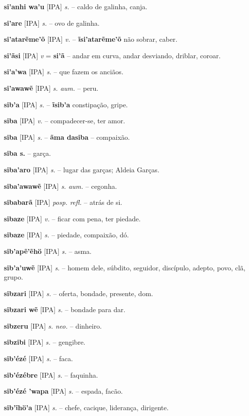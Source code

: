 \textbf{si'anhi wa'u} [IPA] \textit{s.} -- caldo de galinha, canja.

\textbf{si'are} [IPA] \textit{s.} -- ovo de galinha.

\textbf{si'atarẽme'õ} [IPA] \textit{v.} -- \textbf{ĩsi'atarẽme'õ} não sobrar, caber.

\textbf{si'ãsi} [IPA] \textit{v} = \textbf{si'ã} -- andar em curva, andar desviando, driblar, coroar.

\textbf{si'a'wa} [IPA] \textit{s.} -- que fazem os anciãos.

\textbf{si'awawẽ} [IPA] \textit{s. aum.} -- peru.

\textbf{sib'a} [IPA] \textit{s.} -- \textbf{ĩsib'a} constipação, gripe.

\textbf{siba} [IPA] \textit{v.} -- compadecer-se, ter amor.

\textbf{siba} [IPA] \textit{s.} -- \textbf{ãma dasiba} -- compaixão.

\textbf{siba s.} -- garça.

\textbf{siba'aro} [IPA] \textit{s.} -- lugar das garças; Aldeia Garças.

\textbf{siba'awawẽ} [IPA] \textit{s. aum.} -- cegonha.

\textbf{sibabarã} [IPA] \textit{posp. refl.} -- atrás de si.

\textbf{sibaze} [IPA] \textit{v.} -- ficar com pena, ter piedade.

\textbf{sibaze} [IPA] \textit{s.} -- piedade, compaixão, dó.

\textbf{sib'apẽ'ẽhö} [IPA] \textit{s.} -- asma.

\textbf{sib'a'uwẽ} [IPA] \textit{s.} -- homem dele, súbdito, seguidor, discípulo, adepto, povo, clã, grupo.

\textbf{sibzari} [IPA] \textit{s.} -- oferta, bondade, presente, dom.

\textbf{sibzari wẽ} [IPA] \textit{s.} -- bondade para dar.

\textbf{sibzeru} [IPA] \textit{s. neo.} -- dinheiro.

\textbf{sibzibi} [IPA] \textit{s.} -- gengibre.

\textbf{sib'ézé} [IPA] \textit{s.} -- faca.

\textbf{sib'ézébre} [IPA] \textit{s.} -- faquinha.

\textbf{sib'ézé 'wapa} [IPA] \textit{s.} -- espada, facão.

\textbf{sib'ĩhö'a} [IPA] \textit{s.} -- chefe, cacique, liderança, dirigente.

